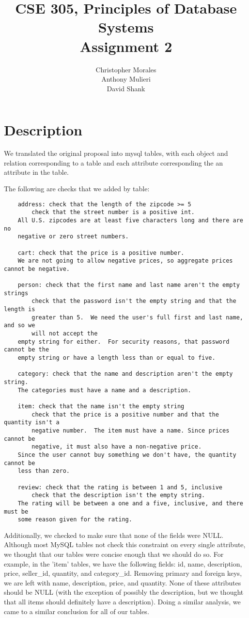 \documentclass{article}[12pt]
\title{CSE 305, Principles of Database Systems \\ Assignment 2}
\author{Christopher Morales\\Anthony Mulieri\\David Shank
\bigskip
}
\begin{document}
\doublespacing\maketitle

\newpage
\section*{Description}
We translated the original proposal into mysql tables, with each object and
relation corresponding to a table and each attribute corresponding the an
attribute in the table.


The following are checks that we added by table:


\begin{verbatim}
    address: check that the length of the zipcode >= 5
        check that the street number is a positive int.
    All U.S. zipcodes are at least five characters long and there are no
    negative or zero street numbers.

    cart: check that the price is a positive number.
    We are not going to allow negative prices, so aggregate prices cannot be negative.

    person: check that the first name and last name aren't the empty strings
        check that the password isn't the empty string and that the length is
        greater than 5.  We need the user's full first and last name, and so we
        will not accept the
    empty string for either.  For security reasons, that password cannot be the
    empty string or have a length less than or equal to five.

    category: check that the name and description aren't the empty string.
    The categories must have a name and a description.

    item: check that the name isn't the empty string
        check that the price is a positive number and that the quantity isn't a
        negative number.  The item must have a name. Since prices cannot be
        negative, it must also have a non-negative price.
    Since the user cannot buy something we don't have, the quantity cannot be
    less than zero.

    review: check that the rating is between 1 and 5, inclusive
        check that the description isn't the empty string.
    The rating will be between a one and a five, inclusive, and there must be
    some reason given for the rating.
\end{verbatim}


Additionally, we checked to make sure that none of the fields were NULL.
Although most MySQL tables not check this constraint on every single attribute,
we thought that our tables were concise enough that we should do so. For
example, in the 'item' tables, we have the following fields: id, name,
description, price, seller\_id, quantity, and category\_id. Removing primary and
foreign keys, we are left with name, description, price, and quantity. None of
these attributes should be NULL (with the exception of possibly the
description, but we thought that all items should definitely have a
description). Doing a similar analysis, we came to a similar conclusion for all
of our tables.  
\end{document}
